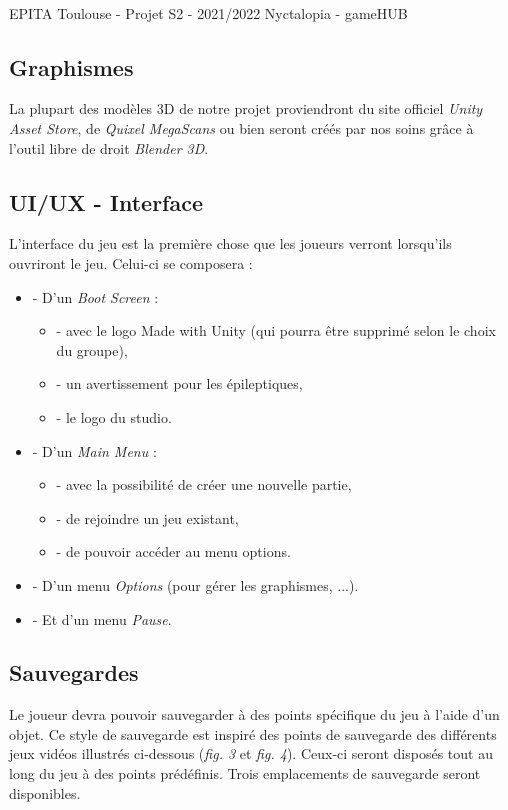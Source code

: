 \vfill
\noindent\makebox[\linewidth]{\rule{.8\paperwidth}{.6pt}}\\[0.2cm]
EPITA Toulouse - Projet S2 - 2021/2022 \hfill Nyctalopia - gameHUB
\noindent\makebox[\linewidth]{\rule{.8\paperwidth}{.6pt}}

\subsection{Graphismes}
\setlength{\parindent}{5ex}


La plupart des modèles 3D de notre projet proviendront du site officiel \emph{Unity Asset Store}, de \emph{Quixel MegaScans} ou bien seront créés par nos soins grâce à l'outil libre de droit \emph{Blender 3D}.

\subsection{UI/UX - Interface}
\setlength{\parindent}{5ex}
L'interface du jeu est la première chose que les joueurs verront lorsqu'ils ouvriront le jeu. Celui-ci se composera :
\begin{itemize}
    \item - D'un \emph{Boot Screen} :
    \begin{itemize}
        \item - avec le logo Made with Unity (qui pourra être supprimé selon le choix du groupe),
        \item - un avertissement pour les épileptiques,
        \item - le logo du studio.
    \end{itemize}
    \item - D'un \emph{Main Menu} : 
    \begin{itemize}
        \item - avec la possibilité de créer une nouvelle partie,
        \item - de rejoindre un jeu existant,
        \item - de pouvoir accéder au menu options.
    \end{itemize}
    \item - D'un menu \emph{Options} (pour gérer les graphismes, ...).
    \item - Et d'un menu \emph{Pause}.
\end{itemize}

\subsection{Sauvegardes}
\setlength{\parindent}{5ex}
Le joueur devra pouvoir sauvegarder à des points spécifique du jeu à l'aide d'un objet. Ce style de sauvegarde est inspiré des points de sauvegarde des différents jeux vidéos illustrés ci-dessous (\emph{fig. 3} et \emph{fig. 4}).
Ceux-ci seront disposés tout au long du jeu à des points prédéfinis. Trois emplacements de sauvegarde seront disponibles.

